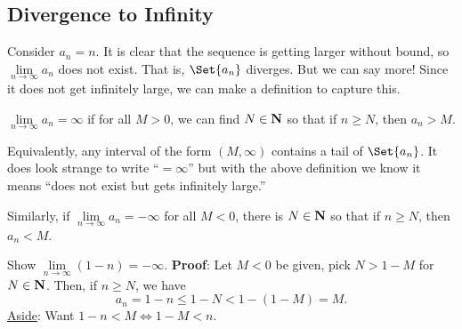 \subsection{Divergence to Infinity}
Consider $ a_n=n $. It is clear that the sequence is getting larger without bound, so $ \lim\limits_{{n} \to {\infty}}a_n $
does not exist. That is, $ \Set{a_n} $ diverges. But we can say more! Since it does not get infinitely large,
we can make a definition to capture this.
\begin{Definition}{}{}
    $ \lim\limits_{{n} \to {\infty}}a_n=\infty $ if for all $ M>0 $, we can find $ N\in\mathbf{N} $ so that if $ n\ge N $,
    then $ a_n>M $.

    Equivalently, any interval of the form $ (M,\infty) $ contains a tail of $ \Set{a_n} $.
    \tcblower{}
    It does look strange to write ``$ =\infty $'' but with the above definition we know it means ``does not exist but gets infinitely large.''

    Similarly, if $ \lim\limits_{{n} \to {\infty}}a_n=-\infty $ for all $ M<0 $, there is $ N\in\mathbf{N} $ so that if $ n\ge N $, then $ a_n<M $.
\end{Definition}
\begin{Example}{}{}
    Show $ \lim\limits_{{n} \to {\infty}}(1-n)=-\infty $.
    \tcblower{}
    \textbf{Proof}: Let $ M<0 $ be given, pick $ N>1-M $ for $ N\in\mathbf{N} $. Then, if $ n\ge N $, we have
    \[ a_n=1-n\le 1-N<1-(1-M)=M. \]
    \underline{Aside}: Want $ 1-n<M\iff 1-M<n $.
\end{Example}